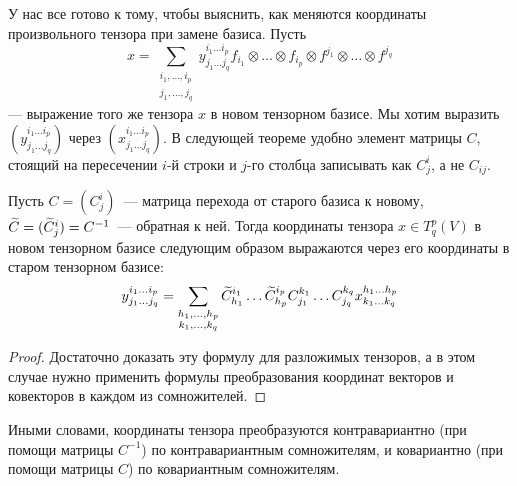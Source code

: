 У нас все готово к тому, чтобы выяснить, как меняются координаты
произвольного тензора при замене базиса. Пусть
$$
x = \sum_{\substack{i_1,\dots,i_p\\j_1,\dots,j_q}}
y^{i_1\dots i_p}_{j_1\dots j_q}f_{i_1}\otimes\dots\otimes
f_{i_p}\otimes f^{j_1}\otimes\dots\otimes f^{j_q}
$$
--- выражение того
же тензора $x$ в новом тензорном базисе. Мы хотим выразить
$\left( y^{i_1\dots i_p}_{j_1\dots j_q}\right)$ через
$\left( x^{i_1\dots i_p}_{j_1\dots j_q}\right)$. В следующей теореме
удобно элемент матрицы $C$, стоящий на пересечении $i$-й строки и
$j$-го столбца записывать как $C^i_j$, а не $C_{ij}$.

\begin{theorem}
Пусть $C = (C^i_j)$~--- матрица перехода от старого базиса к новому,
$\widetilde{C} = (\widetilde{C}^i_j) = C^{-1}$~--- обратная к ней. Тогда
координаты тензора $x\in T^p_q(V)$ в новом тензорном базисе следующим
образом выражаются через его координаты в старом тензорном базисе:
$$
y^{i_1\dots i_p}_{j_1\dots j_q} =
\sum_{\substack{h_1,\dots,h_p\\k_1,\dots,k_q}}
\widetilde{C}^{i_1}_{h_1}\dots\widetilde{C}^{i_p}_{h_p}C^{k_1}_{j_1}\dots C^{k_q}_{j_q}
x^{h_1\dots h_p}_{k_1\dots k_q}
$$
\end{theorem}
\begin{proof}
Достаточно доказать эту формулу для разложимых тензоров, а в этом
случае нужно применить формулы преобразования координат векторов и
ковекторов в каждом из сомножителей.
\end{proof}
Иными словами, координаты тензора преобразуются контравариантно (при
помощи матрицы $C^{-1}$) по контравариантным сомножителям, и
ковариантно (при помощи матрицы $C$) по ковариантным сомножителям.
